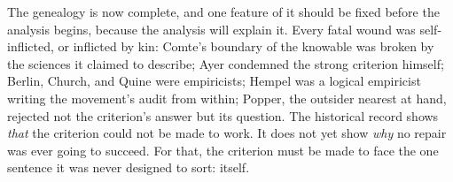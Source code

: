 The genealogy is now complete, and one feature of it should be fixed before the analysis begins, because the analysis will explain it. Every fatal wound was self-inflicted, or inflicted by kin: Comte's boundary of the knowable was broken by the sciences it claimed to describe; Ayer condemned the strong criterion himself; Berlin, Church, and Quine were empiricists; Hempel was a logical empiricist writing the movement's audit from within; Popper, the outsider nearest at hand, rejected not the criterion's answer but its question. The historical record shows \emph{that} the criterion could not be made to work. It does not yet show \emph{why} no repair was ever going to succeed. For that, the criterion must be made to face the one sentence it was never designed to sort: itself.
